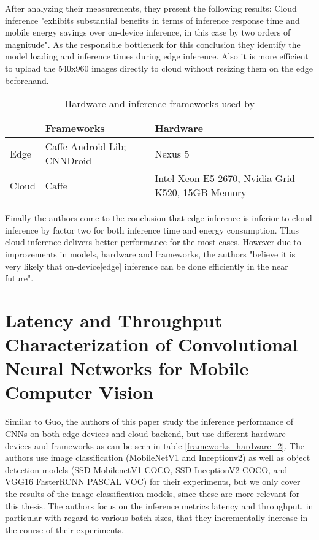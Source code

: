 After analyzing their measurements, they present the following results:
Cloud inference "exhibits substantial benefits
in terms of inference response time and mobile energy savings
over on-device inference, in this case by two orders of magnitude". As the responsible bottleneck for this conclusion they identify the model loading and inference times during edge inference.
Also it is more efficient to upload the 540x960 images directly to cloud without resizing them on the edge beforehand.


\begin{table}[H]
\centering
\caption{Hardware and inference frameworks used by \cite{DBLP:conf/ic2e/Guo18}}
\begin{tabular}{@{}lll@{}}
\toprule
 & Frameworks & Hardware \\
 \midrule
Edge & Caffe Android Lib; CNNDroid & Nexus 5 \\
Cloud & Caffe & Intel Xeon E5-2670, Nvidia Grid K520, 15GB Memory\\
\bottomrule

\end{tabular}

\label{frameworks_hardware_1}
\end{table}
Finally the authors come to the conclusion that edge inference is inferior to cloud inference by factor two for both inference time and energy consumption. Thus cloud inference delivers better performance for the most cases. However due to improvements in models, hardware and frameworks, the authors "believe it is
very likely that on-device[edge] inference can be done efficiently in the near future". 
\section{Latency and Throughput Characterization of Convolutional
Neural Networks for Mobile Computer Vision}
Similar to Guo, the authors of this paper study the inference performance of CNNs on both edge devices and cloud backend, but use different hardware devices and frameworks as can be seen in table \ref{frameworks_hardware_2}. 
The authors use image classification (MobileNetV1 and Inceptionv2) as well as object detection models (SSD MobilenetV1 COCO, SSD InceptionV2 COCO,
and VGG16 FasterRCNN PASCAL VOC) for their experiments, but we only cover the results of the image classification models, since these are more relevant for this thesis.
The authors focus on the inference metrics latency and throughput, in particular with regard to various batch sizes, that they incrementally increase in the course of their experiments.


